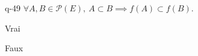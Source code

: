 \begin{truefalse}{q-49}
$\forall A,  B\in\mathcal{P}(E),\ A\subset B \implies f(A)\subset f(B)$.
\item* Vrai
\item Faux
\end{truefalse}


